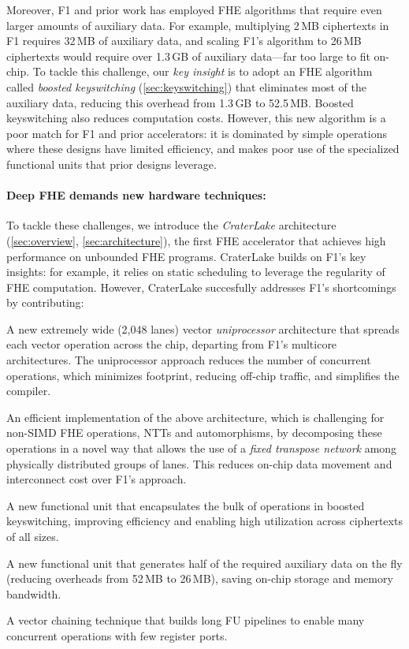Moreover, F1 and prior work has employed FHE algorithms that require even
larger amounts of auxiliary data. For example, multiplying 2\,MB ciphertexts in
F1 requires 32\,MB of auxiliary data, and scaling F1's algorithm to 26\,MB
ciphertexts would require over 1.3\,GB of auxiliary data---far too large to fit
on-chip. To tackle this challenge, our \emph{key insight} is to adopt an FHE
algorithm called \emph{boosted keyswitching} (\autoref{sec:keyswitching}) that
eliminates most of the auxiliary data, reducing this overhead from 1.3\,GB to
52.5\,MB. Boosted keyswitching also reduces computation costs. However, this
new algorithm is a poor match for F1 and prior accelerators: it is dominated by
simple operations where these designs have limited efficiency, and makes poor
use of the specialized functional units that prior designs leverage.

\paragraph{Deep FHE demands new hardware techniques:}
To tackle these challenges, we introduce the \emph{CraterLake} architecture
(\autoref{sec:overview}, \autoref{sec:architecture}), the first FHE accelerator
that achieves high performance on unbounded FHE programs. CraterLake builds on
F1's key insights: for example, it relies on static scheduling to
leverage the regularity of FHE computation. However, CraterLake succesfully
addresses F1's shortcomings by contributing:
\begin{compactitem}
\item A new extremely wide (2,048 lanes) vector \emph{uniprocessor}
    architecture that spreads each vector operation across the chip, departing
    from F1's multicore architectures. The uniprocessor approach reduces the
    number of concurrent operations, which minimizes footprint, reducing
    off-chip traffic, and simplifies the compiler.
\item An efficient implementation of the above architecture, which is
    challenging for non-SIMD FHE operations, NTTs and automorphisms, by
    decomposing these operations in a novel way that allows the use of a
    \emph{fixed transpose network} among physically distributed groups of
    lanes. This reduces on-chip data movement and interconnect cost over F1's
    approach.
\item A new functional unit that encapsulates the bulk of operations in boosted
    keyswitching, improving efficiency and enabling high utilization across
    ciphertexts of all sizes.
\item A new functional unit that generates half of the required auxiliary data
    on the fly (reducing overheads from 52\,MB to 26\,MB), saving on-chip
    storage and memory bandwidth.
\item A vector chaining technique that builds long FU pipelines to enable many
    concurrent operations with few register ports.
\end{compactitem}

